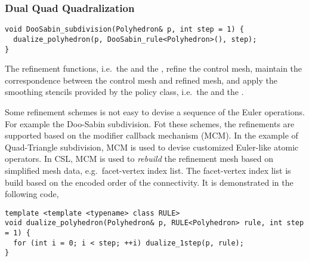 \subsubsection{Dual Quad Quadralization}
\begin{lstlisting}
void DooSabin_subdivision(Polyhedron& p, int step = 1) {
  dualize_polyhedron(p, DooSabin_rule<Polyhedron>(), step);
}
\end{lstlisting}

The refinement functions, i.e.\ the  
and the , 
refine the control mesh, maintain the correspondence between the 
control mesh and refined mesh, and apply the smoothing stencils 
provided by the policy class, i.e.\ the  
and the . 

Some refinement schemes is not easy to devise a sequence
of the Euler operations. For example the Doo-Sabin subdivision.
Fot these schemes, the refinements are supported based on the
modifier callback mechanism (MCM). In the example of 
Quad-Triangle subdivision, MCM is used to devise 
customized Euler-like atomic operators.
In CSL, MCM is used to \emph{rebuild} the refinement
mesh based on simplified mesh data, e.g.\ facet-vertex index list.
The facet-vertex index list is build based on the encoded order
of the connectivity. It is demonstrated in the following code,

\begin{lstlisting}
template <template <typename> class RULE>
void dualize_polyhedron(Polyhedron& p, RULE<Polyhedron> rule, int step = 1) {
  for (int i = 0; i < step; ++i) dualize_1step(p, rule);
}
\end{lstlisting}


